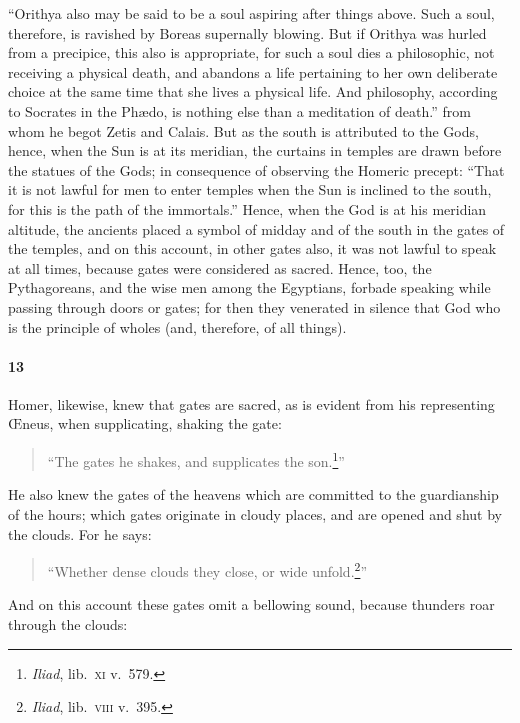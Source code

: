 \documentclass[a4paper,12pt]{article}
\begin{document}
{``Orithya also may be said to be a soul aspiring after things above. Such a
soul, therefore, is ravished by Boreas supernally blowing. But if Orithya was
hurled from a precipice, this also is appropriate, for such a soul dies a
philosophic, not receiving a physical death, and abandons a life pertaining to
her own deliberate choice at the same time that she lives a physical life. And
philosophy, according to Socrates in the Ph{\ae}do, is nothing else than a
meditation of death.''} from whom he begot Zetis and Calais. But as the south
is attributed to the Gods, hence, when the Sun is at its meridian, the curtains
in temples are drawn before the statues of the Gods; in consequence of
observing the Homeric precept: ``That it is not lawful for men to enter temples
when the Sun is inclined to the south, for this is the path of the immortals.''
Hence, when the God is at his meridian altitude, the ancients placed a symbol
of midday and of the south in the gates of the temples, and on this account, in
other gates also, it was not lawful to speak at all times, because gates were
considered as sacred. Hence, too, the Pythagoreans, and the wise men among the
Egyptians, forbade speaking while passing through doors or gates; for then they
venerated in silence that God who is the principle of wholes (and, therefore,
of all things).


\paragraph{13} Homer, likewise, knew that gates are sacred, as is evident from
his representing {\OE}neus, when supplicating, shaking the gate:

\begin{verse}
``The gates he shakes, and supplicates the son.\footnote{\textit{Iliad}, lib.~\textsc{xi} v.~579.}''
\end{verse}

\noindent He also knew the gates of the heavens which are committed to the
guardianship of the hours; which gates originate in cloudy places, and are
opened and shut by the clouds. For he says:

\begin{verse}
``Whether dense clouds they close, or wide unfold.\footnote{\textit{Iliad}, lib.~\textsc{viii} v.~395.}''
\end{verse}

\noindent And on this account these gates omit a bellowing sound, because thunders roar through the clouds:
\end{document}
